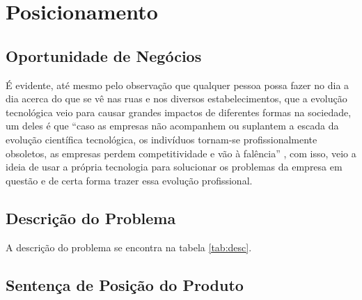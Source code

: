 \section{Posicionamento}
\subsection{Oportunidade de Negócios}

É evidente, até mesmo pelo observação que qualquer pessoa possa fazer no dia a dia acerca do que se vê nas ruas e nos diversos estabelecimentos, que a evolução tecnológica veio para causar grandes impactos de diferentes formas na sociedade, um deles é que “caso as empresas não acompanhem ou suplantem a escada da evolução científica tecnológica, os indivíduos tornam-se profissionalmente obsoletos, as empresas perdem competitividade e vão à falência” \cite{longo2007alguns}, com isso, veio a ideia de usar a própria tecnologia para solucionar os problemas da empresa em questão e de certa forma trazer essa evolução profissional.

\subsection{Descrição do Problema}

A descrição do problema se encontra na tabela \ref{tab:desc}.

\begin{table}[!h]
\centering
\caption{Descrição do problema}
\label{tab:desc}
\end{table}

\subsection{Sentença de Posição do Produto}

